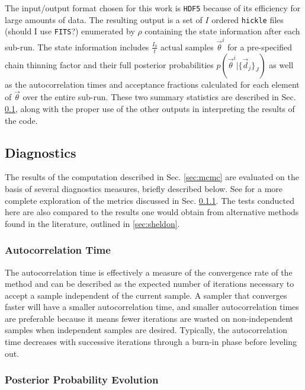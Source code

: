 \documentclass[preprint]{aastex}
\begin{document}
The input/output format chosen for this work is \texttt{HDF5} because of its efficiency for large amounts of data.  The resulting output is a set of $I$ ordered \texttt{hickle} files (should I use \texttt{FITS}?) enumerated by $\rho$ containing the state information after each sub-run.  The state information includes $\frac{I_{0}}{t}$ actual samples $\vec{\theta}^{i}$ for a pre-specified chain thinning factor and their full posterior probabilities $p(\vec{\theta}^{i}|\{\vec{d}_{j}\}_{J})$ as well as the autocorrelation times and acceptance fractions calculated for each element of $\vec{\theta}$ over the entire sub-run.  These two summary statistics are described in Sec. \ref{sec:diag}, along with the proper use of the other outputs in interpreting the results of the code.

\clearpage
\subsection{Diagnostics}
\label{sec:diag}

The results of the computation described in Sec. \ref{sec:mcmc} are evaluated on the basis of several diagnostics measures, briefly described below.  See \citet{for12} for a more complete exploration of the metrics discussed in Sec. \ref{sec:acorr}.  The tests conducted here are also compared to the results one would obtain from alternative methods found in the literature, outlined in \ref{sec:sheldon}.

\clearpage
\subsubsection{Autocorrelation Time}
\label{sec:acorr}

The autocorrelation time is effectively a measure of the convergence rate of the method and can be described as the expected number of iterations necessary to accept a sample independent of the current sample.  A sampler that converges faster will have a smaller autocorrelation time, and smaller autocorrelation times are preferable because it means fewer iterations are wasted on non-independent samples when independent samples are desired.  Typically, the autocorrelation time decreases with successive iterations through a burn-in phase before leveling out.

\clearpage
\subsubsection{Posterior Probability Evolution}
\label{sec:probs}
\end{document}
